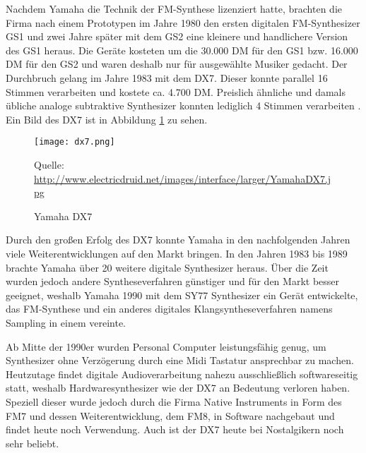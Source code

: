Nachdem Yamaha die Technik der FM-Synthese lizenziert hatte, brachten die Firma nach einem Prototypen im Jahre 1980 den ersten digitalen FM-Synthesizer GS1 und zwei Jahre später mit dem GS2 eine kleinere und handlichere Version des GS1 heraus. Die Geräte kosteten um die 30.000 DM für den GS1 bzw. 16.000 DM für den GS2 und waren deshalb nur für ausgewählte Musiker gedacht. Der Durchbruch gelang im Jahre 1983 mit dem DX7. Dieser konnte parallel 16 Stimmen verarbeiten und kostete ca. 4.700 DM. Preislich ähnliche und damals übliche analoge subtraktive Synthesizer konnten lediglich 4 Stimmen verarbeiten \cite{fmGS1}. Ein Bild des DX7 ist in Abbildung \ref{fig:dx7} zu sehen.

 \begin{figure} [ht]
\centering
  \texttt{[image: dx7.png]}
\caption{Yamaha DX7}
\label{fig:dx7}
Quelle: \url{http://www.electricdruid.net/images/interface/larger/YamahaDX7.jpg}
\end{figure}

Durch den großen Erfolg des DX7 konnte Yamaha in den nachfolgenden Jahren viele Weiterentwicklungen auf den Markt bringen. In den Jahren 1983 bis 1989 brachte Yamaha über 20 weitere digitale Synthesizer heraus. Über die Zeit wurden jedoch andere Syntheseverfahren günstiger und für den Markt besser geeignet, weshalb Yamaha 1990 mit dem SY77 Synthesizer ein Gerät entwickelte, das FM-Synthese und ein anderes digitales Klangsyntheseverfahren namens Sampling in einem vereinte.\cite{fmGS1}

Ab Mitte der 1990er wurden Personal Computer leistungsfähig genug, um Synthesizer ohne Verzögerung durch eine Midi Tastatur ansprechbar zu machen. Heutzutage findet digitale Audioverarbeitung nahezu ausschließlich softwareseitig statt, weshalb Hardwaresynthesizer wie der DX7 an Bedeutung verloren haben. Speziell dieser wurde jedoch durch die Firma Native Instruments in Form des FM7 und dessen Weiterentwicklung, dem FM8, in Software nachgebaut und findet heute noch Verwendung. Auch ist der DX7 heute bei Nostalgikern noch sehr beliebt.\cite{fmGS1}